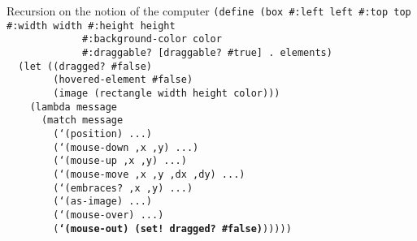 \begin{frame}{Recursion on the notion of the computer}
  \tiny
  \texttt{(define (box \#:left left \#:top top \#:width width \#:height height\\
    \ \ \ \ \ \ \ \ \ \ \ \ \ \#:background-color color\\
    \ \ \ \ \ \ \ \ \ \ \ \ \ \#:draggable? [draggable? \#true] . elements)\\
    \ \ (let ((dragged? \#false)\\
    \ \ \ \ \ \ \ \ (hovered-element \#false)\\
    \ \ \ \ \ \ \ \ (image (rectangle width height color)))\\
    \ \ \ \ (lambda message\\
    \ \ \ \ \ \ (match message\\
    \ \ \ \ \ \ \ \ (`(position) ...)\\
    \ \ \ \ \ \ \ \ (`(mouse-down ,x ,y) ...)\\
    \ \ \ \ \ \ \ \ (`(mouse-up ,x ,y) ...)\\
    \ \ \ \ \ \ \ \ (`(mouse-move ,x ,y ,dx ,dy) ...)\\
    \ \ \ \ \ \ \ \ (`(embraces? ,x ,y) ...)\\
    \ \ \ \ \ \ \ \ (`(as-image) ...)\\
    \ \ \ \ \ \ \ \ (`(mouse-over) ...)\\
    \ \ \ \ \ \ \ \ (\textbf{`(mouse-out) (set!\ dragged?\ \#false)})))))\\
    \ \\
    \ \\
    \ \\
    \ \\
    \ \\
    \ \\
    \ \\
    \ \\
    \ \\
    \ \\
    \ \\
    \ 
    }
\end{frame}





